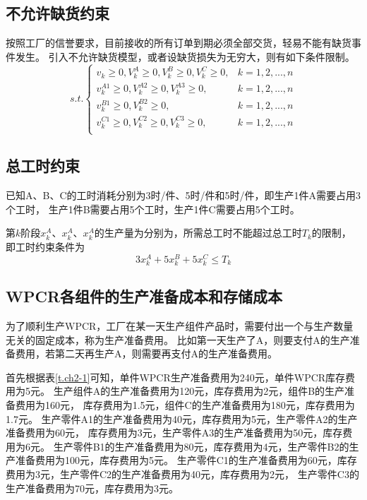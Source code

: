 \subsection{不允许缺货约束}

按照工厂的信誉要求，目前接收的所有订单到期必须全部交货，轻易不能有缺货事件发生。
引入不允许缺货模型，或者设缺货损失为无穷大，则有如下条件限制。
\begin{equation}
    s.t.
    \begin{cases}
        v_k \geqslant 0, V_k^A \geqslant 0,V_k^B \geqslant 0,V_k^C \geqslant 0, & k=1,2,...,n \\
        v_k^{A1} \geqslant 0, V_k^{A2} \geqslant 0,V_k^{A3} \geqslant 0, & k=1,2,...,n \\
        v_k^{B1} \geqslant 0, V_k^{B2} \geqslant 0, & k=1,2,...,n \\
        v_k^{C1} \geqslant 0, V_k^{C2} \geqslant 0,V_k^{C3} \geqslant 0, & k=1,2,...,n \\
    \end{cases}
\end{equation}

\subsection{总工时约束}

已知A、B、C的工时消耗分别为3时/件、5时/件和5时/件，即生产1件A需要占用3个工时，
生产1件B需要占用5个工时，生产1件C需要占用5个工时。

第$k$阶段$x_k^A$、$x_k^A$、$x_k^A$的生产量为分别为，所需总工时不能超过总工时$T_k$的限制，
即工时约束条件为
\begin{equation}
    3x_k^A + 5x_k^B + 5x_k^C \leq T_k
\end{equation}

\subsection{WPCR各组件的生产准备成本和存储成本}

为了顺利生产WPCR，工厂在某一天生产组件产品时，需要付出一个与生产数量无关的固定成本，称为生产准备费用。
比如第一天生产了A，则要支付A的生产准备费用，若第二天再生产A，则需要再支付A的生产准备费用。

首先根据表\ref{t.ch2-1}可知，单件WPCR生产准备费用为240元，单件WPCR库存费用为5元。
生产组件A的生产准备费用为120元，库存费用为2元，组件B的生产准备费用为160元，
库存费用为1.5元，组件C的生产准备费用为180元，库存费用为1.7元。
生产零件A1的生产准备费用为40元，库存费用为5元，生产零件A2的生产准备费用为60元，
库存费用为3元，生产零件A3的生产准备费用为50元，库存费用为6元。
生产零件B1的生产准备费用为80元，库存费用为4元，生产零件B2的生产准备费用为100元，库存费用为5元。
生产零件C1的生产准备费用为60元，库存费用为3元，生产零件C2的生产准备费用为40元，库存费用为2元，
生产零件C3的生产准备费用为70元，库存费用为3元。

